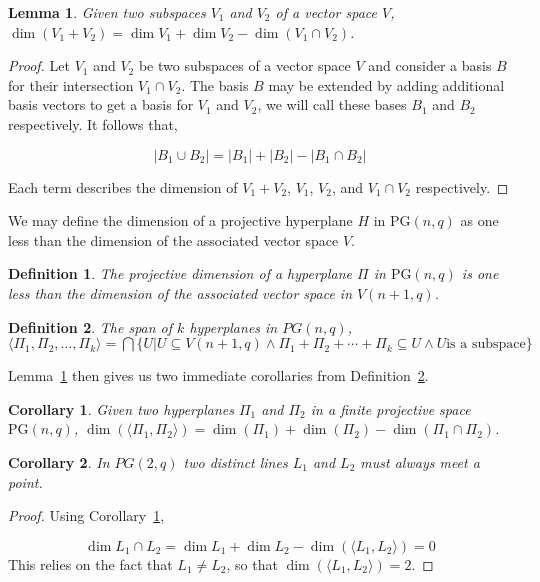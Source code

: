 \documentclass{article}
\newtheorem{lemma}{Lemma}
\newtheorem{corollary}{Corollary}
\newtheorem{definition}{Definition}
\newcommand{\PG}{\mathrm{PG}}
\begin{document}
\begin{lemma}\label{lemma:2}
  Given two subspaces \(V_1\) and \(V_2\) of a vector space \(V\), \(\dim (V_1 + V_2) = \dim V_1 + \dim V_2 - \dim (V_1 \cap V_2)\).
\end{lemma}

\begin{proof}
  Let \(V_1\) and \(V_2\) be two subspaces of a vector space \(V\) and consider a basis \(B\) for their intersection \(V_1 \cap V_2\). The basis \(B\) may be extended by adding additional basis vectors to get a basis for \(V_1\) and \(V_2\), we will call these bases \(B_1\) and \(B_2\) respectively.
  It follows that,

  \begin{equation*}
    | B_1 \cup B_2 | = |B_1| + |B_2| - |B_1 \cap B_2|
  \end{equation*}

  Each term describes the dimension of \(V_1 + V_2\), \(V_1\), \(V_2\), and \(V_1 \cap V_2\) respectively.
\end{proof}

We may define the dimension of a projective hyperplane \(H\) in \(\PG(n, q)\) as one less than the dimension of the associated vector space \(V\).
\begin{definition}
  The projective dimension of a hyperplane \(\Pi\) in \(\PG(n, q)\) is one less than the dimension of the associated vector space in \(V(n + 1, q)\).
\end{definition}

\begin{definition}\label{def:1}
  The span of \(k\) hyperplanes in \(PG(n, q)\), \(\langle \Pi_1, \Pi_2, \ldots, \Pi_k \rangle = \bigcap \{U  | U \subseteq V(n + 1, q) \land \Pi_1 + \Pi_2 + \cdots + \Pi_k \subseteq U \land U \text{is a subspace}\}\)
\end{definition}

Lemma~\ref{lemma:2} then gives us two immediate corollaries from Definition~\ref{def:1}.
\begin{corollary}\label{cor:1}
  Given two hyperplanes \(\Pi_1\) and \(\Pi_2\) in a finite projective space \(\PG(n, q)\), \(\dim(\langle \Pi_1, \Pi_2 \rangle) = \dim (\Pi_1) + \dim (\Pi_2) - \dim (\Pi_1 \cap \Pi_2)\).
\end{corollary}

\begin{corollary}
  In \(PG(2, q)\) two distinct lines \(L_1\) and \(L_2\) must always meet a point.
\end{corollary}
\begin{proof}
  Using Corollary~\ref{cor:1},

  \begin{equation*}
    \dim L_1 \cap L_2 = \dim L_1 + \dim L_2 - \dim (\langle L_1, L_2 \rangle) = 0
  \end{equation*}
  This relies on the fact that \(L_1 \neq L_2\), so that \(\dim (\langle L_1, L_2 \rangle) = 2\).
\end{proof}
\end{document}
